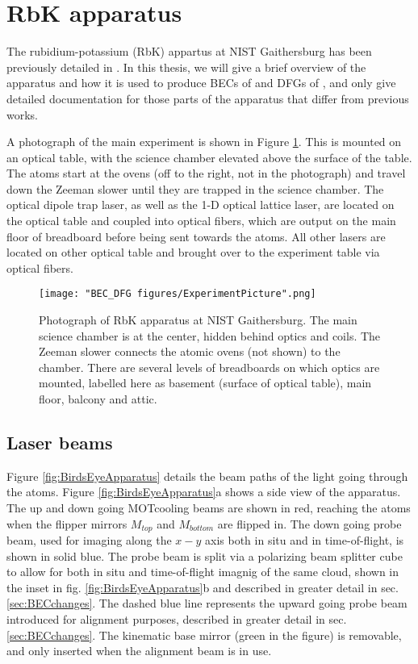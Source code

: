 \section{RbK apparatus}

The rubidium-potassium (RbK) appartus at NIST Gaithersburg has been previously detailed in \cite{Lin2009,KarinaThesis, AycockThesis}. In this thesis, we will give a brief overview of the apparatus and how it is used to produce BECs of \Rb{} and DFGs of \K{}, and only give detailed documentation for those parts of the apparatus that differ from previous works. 

A photograph of the main experiment is shown in Figure \ref{fig:ExperimentPicture}. This is mounted on an optical table, with the science chamber elevated above the surface of the table. The atoms start at the ovens (off to the right, not in the photograph) and travel down the Zeeman slower until they are trapped in the science chamber. The optical dipole trap laser, as well as the 1-D optical lattice laser, are located on the optical table and coupled into optical fibers, which are output on the main floor of breadboard before being sent towards the atoms. All other lasers are located on other optical table and brought over to the experiment table via optical fibers. 

\begin{figure}
	\texttt{[image: "BEC\_DFG figures/ExperimentPicture".png]}
\caption[Photograph of RbK apparatus at NIST Gaithersburg]{Photograph of RbK apparatus at NIST Gaithersburg. The main science chamber is at the center, hidden behind optics and coils. The Zeeman slower connects the atomic ovens (not shown) to the chamber. There are several levels of breadboards on which optics are mounted, labelled here as basement (surface of optical table), main floor, balcony and attic.}
\label{fig:ExperimentPicture}
\end{figure}

\subsection{Laser beams}\label{sec:laserBeams}
Figure \ref{fig:BirdsEyeApparatus} details the beam paths of the light going through the atoms. Figure \ref{fig:BirdsEyeApparatus}a shows a side view of the apparatus. The up and down going MOTcooling beams are shown in red, reaching the atoms when the flipper mirrors $M_{top}$ and $M_{bottom}$ are flipped in. The down going probe beam, used for imaging along the $x-y$ axis both in situ and in time-of-flight, is shown in solid blue. The probe beam is split via a polarizing beam splitter cube to allow for both in situ and time-of-flight imagnig of the same cloud, shown in the inset in fig.  \ref{fig:BirdsEyeApparatus}b and described in greater detail in sec. \ref{sec:BECchanges}.  The dashed blue line represents the upward going probe beam introduced for alignment purposes, described in greater detail in sec. \ref{sec:BECchanges}. The kinematic base mirror (green in the figure) is removable, and only inserted when the alignment beam is in use. 

